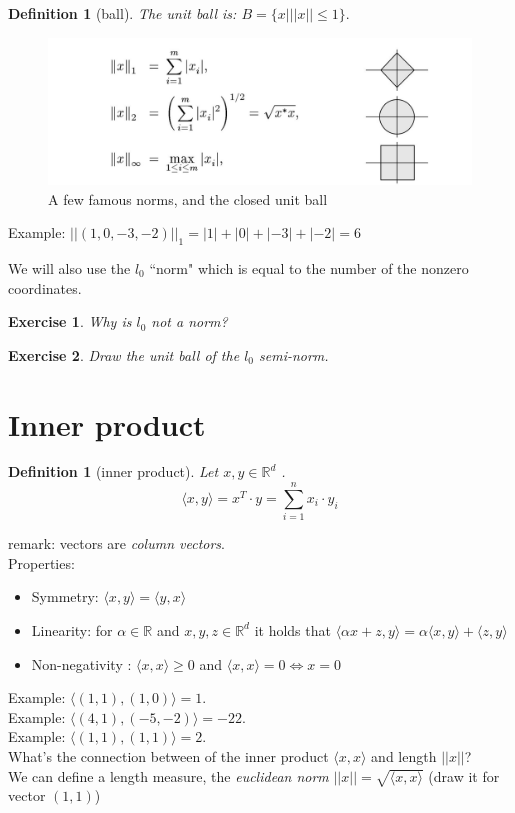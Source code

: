 \documentclass[11pt, oneside]{article}   	%
\newtheorem{definition}[lemma]{Definition}
\newtheorem{exercise}{Exercise}
\begin{document}
\begin{definition}[ball]
The \emph{unit ball} is:  $B = \{x| ||x|| \leq 1\}.$
\end{definition} 
\begin{figure}[h!]
  \centering
    \includegraphics[scale=0.32]{norm.jpg}  
    \caption{A few famous norms, and the closed unit ball}
\end{figure}

Example: $||(1,0,-3,-2)||_1=|1|+|0|+|-3|+|-2|=6$

We will also use the $l_0$ ``norm"  which is equal to the number of the nonzero coordinates.

\begin{exercise}  Why is $l_0$ \emph{not} a norm?  \end{exercise}

\begin{exercise} Draw the unit ball of the  $l_0$ semi-norm. \end{exercise}

\pagebreak
\section{Inner product}


\begin{definition}[inner product]
Let  $x,y\in \mathbb{R}^d$ .
  $$\langle x,y\rangle=x^T\cdot y= \sum_{i=1}^n x_i\cdot y_i$$
 \end{definition}
 remark: vectors are \emph{column vectors}.\\
 Properties:
 \begin{itemize}
\item Symmetry: $\langle x,y\rangle=\langle y,x\rangle$
\item Linearity: for  $\alpha\in \mathbb R$ and  $x,y,z\in \mathbb R^d$ it holds that $\langle \alpha x+z,y\rangle=\alpha \langle x,y\rangle+\langle z,y\rangle$
\item Non-negativity : $\langle x,x\rangle\geq 0$  and $\langle x,x\rangle=0 \Leftrightarrow x=0$ 
 \end{itemize}
 Example: $\langle(1,1),(1,0)\rangle=1$. \\
 Example: $\langle(4,1),(-5,-2)\rangle=-22$. \\
 Example: $\langle(1,1),(1,1)\rangle=2$. \\
What's the connection between of the inner product $\langle x, x\rangle$ and length $||x||$?\\
We can define a length measure, the \emph{euclidean norm} $||x||=\sqrt{\langle x,x\rangle}$ (draw it for vector $(1,1)$)
\end{document}
